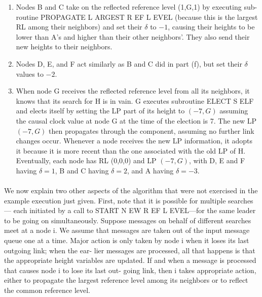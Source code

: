 \begin{enumerate}[label=\alph*]
	\item Nodes B and C take on the reflected reference level (1,G,1) by executing sub- routine PROPAGATE L ARGEST R EF L EVEL (because this is the largest RL among their neighbors) and set their $\delta$ to $-1$, causing their heights to be lower than A’s and higher than their other neighbors’. They also send their new heights to their neighbors.
	\item Nodes D, E, and F act similarly as B and C did in part (f), but set their $\delta$ values to $-2$.
	\item When node G receives the reflected reference level from all its neighbors, it knows that its search for H is in vain. G executes subroutine ELECT S ELF and elects itself by setting the LP part of its height to $(-7,G)$ assuming the causal clock value at node G at the time of the election is 7. The new LP $(-7,G)$ then propagates through the component, assuming no further link changes occur. Whenever a node receives the new LP information, it adopts it because it is more recent than the one associated with the old LP of H. Eventually, each node has RL (0,0,0) and LP $(-7,G)$, with D, E and F having $\delta = 1$, B and C having $\delta = 2$, and A having $\delta = -3$.
\end{enumerate}
\paragraph{}We now explain two other aspects of the algorithm that were not exercised in the example execution just given. First, note that it is possible for multiple searches— each initiated by a call to START N EW R EF L EVEL—for the same leader to be going on simultaneously. Suppose messages on behalf of different searches meet at a node i. We assume that messages are taken out of the input message queue one at a time. Major action is only taken by node i when it loses its last outgoing link; when the ear- lier messages are processed, all that happens is that the appropriate height variables are updated. If and when a message is processed that causes node i to lose its last out- going link, then i takes appropriate action, either to propagate the largest reference level among its neighbors or to reflect the common reference level.
